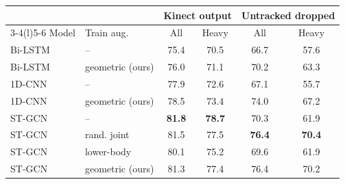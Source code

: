 \begin{tabular}{@{}llcccc@{}}
\toprule
 & & \multicolumn{2}{c}{Kinect output} & \multicolumn{2}{c}{Untracked dropped} \\
\cmidrule(lr){3-4}\cmidrule(l){5-6}
Model & Train aug. & All & Heavy & All & Heavy \\
\midrule
Bi-LSTM & -- & 75.4 & 70.5 & 66.7 & 57.6 \\
Bi-LSTM & geometric (ours) & 76.0 & 71.1 & 70.2 & 63.3 \\
1D-CNN & -- & 77.9 & 72.6 & 67.1 & 55.7 \\
1D-CNN & geometric (ours) & 78.5 & 73.4 & 74.0 & 67.2 \\
ST-GCN & -- & \textbf{81.8} & \textbf{78.7} & 70.3 & 61.9 \\
ST-GCN & rand. joint & 81.5 & 77.5 & \textbf{76.4} & \textbf{70.4} \\
ST-GCN & lower-body & 80.1 & 75.2 & 69.6 & 61.9 \\
ST-GCN & geometric (ours) & 81.3 & 77.4 & 76.4 & 70.2 \\
\bottomrule
\end{tabular}
